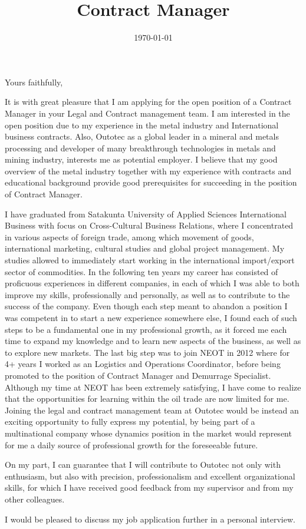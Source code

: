 \documentclass[11pt,a4paper,sans]{moderncv}        %
\title{Contract Manager}                               %
\begin{document}
\date{\today}
\closing{Yours faithfully,}
\makelettertitle

\hspace*{-5cm}

It is with great pleasure that I am applying for the open position of a Contract Manager in your Legal and Contract management team.
I am interested in the open position due to my experience in the metal industry and International
business contracts. Also, Outotec as a global leader in a mineral and metals processing and developer
of many breakthrough technologies in metals and mining industry, interests me as potential employer. I
believe that my good overview of the metal industry together with my experience with contracts and
educational background provide good prerequisites for succeeding in the position of Contract Manager.


I have graduated from Satakunta University of Applied Sciences International Business with focus on
Cross-Cultural Business Relations, where I concentrated in various aspects of foreign trade, among which  movement of goods, international marketing, cultural studies and
global project management. My studies allowed to immediately start working in the international import/export sector
of commodities. In the following ten years my career has consisted of proficuous experiences in different companies, in each of which
I was able to both improve my skills, professionally and personally, as well as to contribute to the success of the company. Even though
each step meant to abandon a position I was competent in to start a new experience somewhere else, I found each of such steps to be a fundamental
one in my professional growth, as it forced me each time to expand my knowledge and to learn new aspects of the business, as well as to
explore new markets. The last big step was to join NEOT in 2012 where for 4+ years I worked as an Logistics
and Operations Coordinator, before being promoted to the position of Contract Manager and Demurrage Specialist. Although my time at NEOT has 
been extremely satisfying, I have come to realize that the opportunities for learning within the oil trade are now limited for me. Joining
the legal and contract management team at Outotec would be instead an exciting opportunity to fully express my potential, by being
part of a multinational company whose dynamics position in the market would represent for me a daily source of professional
growth for the foreseeable future.

On my part, I can guarantee that I will contribute to Outotec not only with enthusiasm, but also with precision, professionalism
and excellent organizational skills, for which I have received good feedback from my supervisor and from my other
colleagues.

I would be pleased to discuss my job application further in a personal interview.
\\

\makeletterclosing
\end{document}
